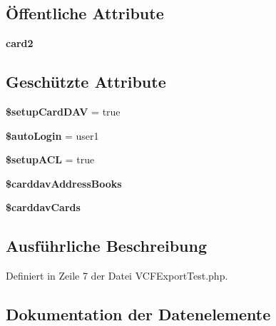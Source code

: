 \subsection*{Öffentliche Attribute}
\begin{DoxyCompactItemize}
\item 
{\bfseries card2}
\end{DoxyCompactItemize}
\subsection*{Geschützte Attribute}
\begin{DoxyCompactItemize}
\item 
\mbox{\label{class_sabre_1_1_card_d_a_v_1_1_v_c_f_export_test_a0f7be98c77f3fd8154e62ae84d669cb5}} 
{\bfseries \$setup\+Card\+D\+AV} = true
\item 
\mbox{\label{class_sabre_1_1_card_d_a_v_1_1_v_c_f_export_test_a795d690f939268dfff976662c089922a}} 
{\bfseries \$auto\+Login} = \textquotesingle{}user1\textquotesingle{}
\item 
\mbox{\label{class_sabre_1_1_card_d_a_v_1_1_v_c_f_export_test_aba0bbfcc4752f385646a9f5b97556e36}} 
{\bfseries \$setup\+A\+CL} = true
\item 
{\bfseries \$carddav\+Address\+Books}
\item 
{\bfseries \$carddav\+Cards}
\end{DoxyCompactItemize}


\subsection{Ausführliche Beschreibung}


Definiert in Zeile 7 der Datei V\+C\+F\+Export\+Test.\+php.



\subsection{Dokumentation der Datenelemente}
\mbox{\label{class_sabre_1_1_card_d_a_v_1_1_v_c_f_export_test_a6c8f214f365d4a09114f6fd6021a7191}} 
